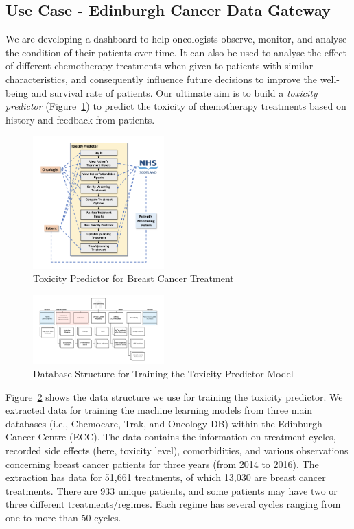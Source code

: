 \subsection{Use Case - Edinburgh Cancer Data Gateway}
\label{sec:useCase}

\noindent
We are developing a dashboard to help oncologists observe, monitor, and analyse the condition of their patients over time. It can also be used to analyse the effect of different chemotherapy treatments when given to patients with similar characteristics, and consequently influence future decisions to improve the well-being and survival rate of patients. Our ultimate aim is to build a \emph{toxicity predictor} (Figure~\ref{fig:USTANDiagram}) to predict the toxicity of chemotherapy treatments based on history and feedback from patients.
%
\begin{figure}[t!]
    \centering
    \includegraphics[width=0.45\textwidth]{images/USTANUseCase2.png}
    \caption{Toxicity Predictor for Breast Cancer Treatment}
    \label{fig:USTANDiagram}
\end{figure}
%
\begin{figure}[t!]
    \centering %
    \includegraphics[width=0.45\textwidth]{images/USTANDataGateway.png}
    \caption{Database Structure for Training the Toxicity Predictor Model}
    \label{fig:ECG}
\end{figure}
Figure~\ref{fig:ECG} shows the data structure we use for training the toxicity predictor. We extracted data 
for training the machine learning models from three main databases (i.e., Chemocare, Trak, and Oncology DB) within the Edinburgh Cancer Centre (ECC). The data contains the information on treatment cycles, recorded side effects (here, toxicity level), comorbidities, and various observations concerning breast cancer patients for three years (from 2014 to 2016). The extraction has data for 51,661 treatments, of which 13,030 are breast cancer treatments. There are 933 unique patients, and some patients may have two or three different treatments/regimes. Each regime has several cycles ranging from one to more than 50 cycles.

